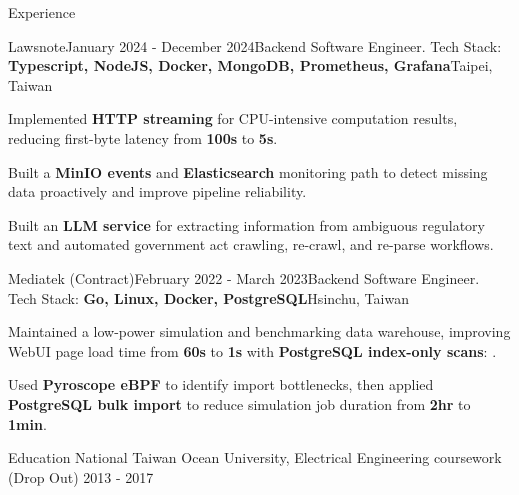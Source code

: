 \documentclass[
	10pt, %
]{resume} %
\begin{document}
\begin{rSection}{Experience}
    \begin{rSubsection}{Lawsnote}{January 2024 - December 2024}{Backend Software Engineer. Tech Stack: {\color{teal}\textbf{Typescript, NodeJS, Docker, MongoDB, Prometheus, Grafana}}}{Taipei, Taiwan}
        \item Implemented \textbf{HTTP streaming} for CPU-intensive computation results, reducing first-byte latency from \textbf{100s} to \textbf{5s}.
        \item Built a \textbf{MinIO events} and \textbf{Elasticsearch} monitoring path to detect missing data proactively and improve pipeline reliability.
        \item Built an \textbf{LLM service} for extracting information from ambiguous regulatory text and automated government act crawling, re-crawl, and re-parse workflows.
    \end{rSubsection}

	\begin{rSubsection}{Mediatek (Contract)}{February 2022 - March 2023}{Backend Software Engineer. Tech Stack: {\color{teal}\textbf{Go, Linux, Docker, PostgreSQL}}}{Hsinchu, Taiwan}
            \item Maintained a low-power simulation and benchmarking data warehouse, improving WebUI page load time from \textbf{60s} to \textbf{1s} with \textbf{PostgreSQL index-only scans}: {}.
            \item Used \textbf{Pyroscope eBPF} to identify import bottlenecks, then applied \textbf{PostgreSQL bulk import} to reduce simulation job duration from \textbf{2hr} to \textbf{1min}.
		\end{rSubsection}
	\end{rSection}



\begin{rSection}{Education}
National Taiwan Ocean University, Electrical Engineering coursework (Drop Out) \hfill 2013 - 2017
\end{rSection}





\end{document}
